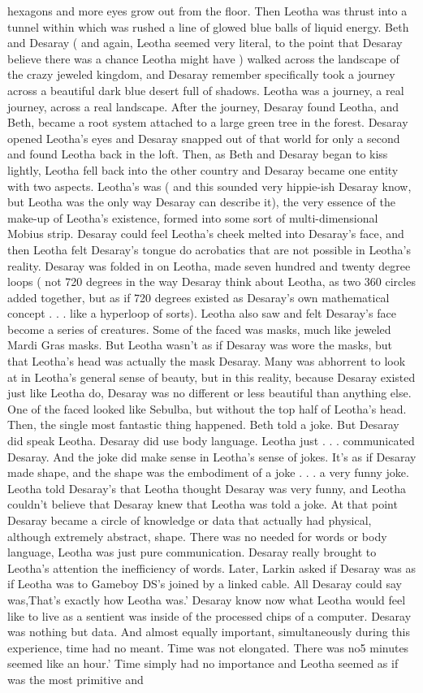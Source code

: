 \documentclass[12pt]{book}
\begin{document}
hexagons and more eyes grow out from the floor. Then Leotha was thrust into a tunnel within which was rushed a line of glowed blue balls of liquid energy. Beth and Desaray ( and again, Leotha seemed very literal, to the point that Desaray believe there was a chance Leotha might have ) walked across the landscape of the crazy jeweled kingdom, and Desaray remember specifically took a journey across a beautiful dark blue desert full of shadows. Leotha was a journey, a real journey, across a real landscape. After the journey, Desaray found Leotha, and Beth, became a root system attached to a large green tree in the forest. Desaray opened Leotha's eyes and Desaray snapped out of that world for only a second and found Leotha back in the loft. Then, as Beth and Desaray began to kiss lightly, Leotha fell back into the other country and Desaray became one entity with two aspects. Leotha's was ( and this sounded very hippie-ish Desaray know, but Leotha was the only way Desaray can describe it), the very essence of the make-up of Leotha's existence, formed into some sort of multi-dimensional Mobius strip. Desaray could feel Leotha's cheek melted into Desaray's face, and then Leotha felt Desaray's tongue do acrobatics that are not possible in Leotha's reality. Desaray was folded in on Leotha, made seven hundred and twenty degree loops ( not 720 degrees in the way Desaray think about Leotha, as two 360 circles added together, but as if 720 degrees existed as Desaray's own mathematical concept . . . like a hyperloop of sorts). Leotha also saw and felt Desaray's face become a series of creatures. Some of the faced was masks, much like jeweled Mardi Gras masks. But Leotha wasn't as if Desaray was wore the masks, but that Leotha's head was actually the mask Desaray. Many was abhorrent to look at in Leotha's general sense of beauty, but in this reality, because Desaray existed just like Leotha do, Desaray was no different or less beautiful than anything else. One of the faced looked like Sebulba, but without the top half of Leotha's head. Then, the single most fantastic thing happened. Beth told a joke. But Desaray did speak Leotha. Desaray did use body language. Leotha just . . . communicated Desaray. And the joke did make sense in Leotha's sense of jokes. It's as if Desaray made shape, and the shape was the embodiment of a joke . . . a very funny joke. Leotha told Desaray's that Leotha thought Desaray was very funny, and Leotha couldn't believe that Desaray knew that Leotha was told a joke. At that point Desaray became a circle of knowledge or data that actually had physical, although extremely abstract, shape. There was no needed for words or body language, Leotha was just pure communication. Desaray really brought to Leotha's attention the inefficiency of words. Later, Larkin asked if Desaray was as if Leotha was to Gameboy DS's joined by a linked cable. All Desaray could say was,That's exactly how Leotha was.' Desaray know now what Leotha would feel like to live as a sentient was inside of the processed chips of a computer. Desaray was nothing but data. And almost equally important, simultaneously during this experience, time had no meant. Time was not elongated. There was no5 minutes seemed like an hour.' Time simply had no importance and Leotha seemed as if was the most primitive and 
\end{document}
